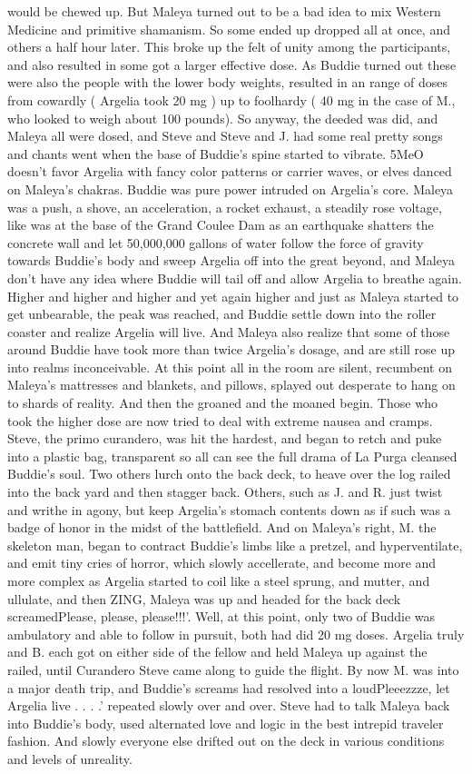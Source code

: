 \documentclass[12pt]{book}
\begin{document}
would be chewed up. But Maleya turned out to be a bad idea to mix Western Medicine and primitive shamanism. So some ended up dropped all at once, and others a half hour later. This broke up the felt of unity among the participants, and also resulted in some got a larger effective dose. As Buddie turned out these were also the people with the lower body weights, resulted in an range of doses from cowardly ( Argelia took 20 mg ) up to foolhardy ( 40 mg in the case of M., who looked to weigh about 100 pounds). So anyway, the deeded was did, and Maleya all were dosed, and Steve and Steve and J. had some real pretty songs and chants went when the base of Buddie's spine started to vibrate. 5MeO doesn't favor Argelia with fancy color patterns or carrier waves, or elves danced on Maleya's chakras. Buddie was pure power intruded on Argelia's core. Maleya was a push, a shove, an acceleration, a rocket exhaust, a steadily rose voltage, like was at the base of the Grand Coulee Dam as an earthquake shatters the concrete wall and let 50,000,000 gallons of water follow the force of gravity towards Buddie's body and sweep Argelia off into the great beyond, and Maleya don't have any idea where Buddie will tail off and allow Argelia to breathe again. Higher and higher and higher and yet again higher and just as Maleya started to get unbearable, the peak was reached, and Buddie settle down into the roller coaster and realize Argelia will live. And Maleya also realize that some of those around Buddie have took more than twice Argelia's dosage, and are still rose up into realms inconceivable. At this point all in the room are silent, recumbent on Maleya's mattresses and blankets, and pillows, splayed out desperate to hang on to shards of reality. And then the groaned and the moaned begin. Those who took the higher dose are now tried to deal with extreme nausea and cramps. Steve, the primo curandero, was hit the hardest, and began to retch and puke into a plastic bag, transparent so all can see the full drama of La Purga cleansed Buddie's soul. Two others lurch onto the back deck, to heave over the log railed into the back yard and then stagger back. Others, such as J. and R. just twist and writhe in agony, but keep Argelia's stomach contents down as if such was a badge of honor in the midst of the battlefield. And on Maleya's right, M. the skeleton man, began to contract Buddie's limbs like a pretzel, and hyperventilate, and emit tiny cries of horror, which slowly accellerate, and become more and more complex as Argelia started to coil like a steel sprung, and mutter, and ullulate, and then ZING, Maleya was up and headed for the back deck screamedPlease, please, please!!!'. Well, at this point, only two of Buddie was ambulatory and able to follow in pursuit, both had did 20 mg doses. Argelia truly and B. each got on either side of the fellow and held Maleya up against the railed, until Curandero Steve came along to guide the flight. By now M. was into a major death trip, and Buddie's screams had resolved into a loudPleeezzze, let Argelia live . . .  .' repeated slowly over and over. Steve had to talk Maleya back into Buddie's body, used alternated love and logic in the best intrepid traveler fashion. And slowly everyone else drifted out on the deck in various conditions and levels of unreality. 
\end{document}
